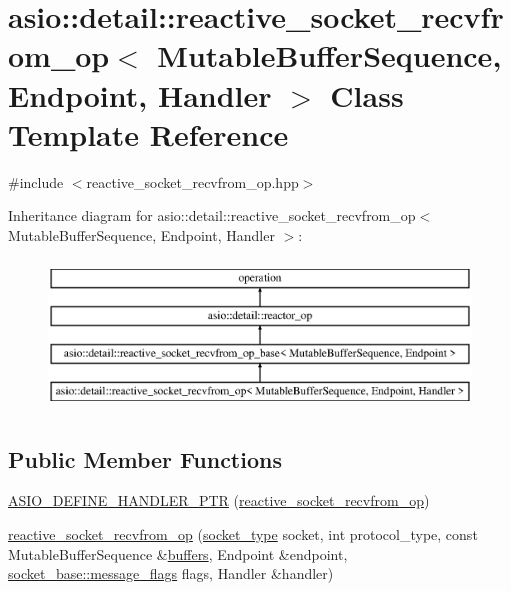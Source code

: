 \hypertarget{classasio_1_1detail_1_1reactive__socket__recvfrom__op}{}\section{asio\+:\+:detail\+:\+:reactive\+\_\+socket\+\_\+recvfrom\+\_\+op$<$ Mutable\+Buffer\+Sequence, Endpoint, Handler $>$ Class Template Reference}
\label{classasio_1_1detail_1_1reactive__socket__recvfrom__op}


{\ttfamily \#include $<$reactive\+\_\+socket\+\_\+recvfrom\+\_\+op.\+hpp$>$}

Inheritance diagram for asio\+:\+:detail\+:\+:reactive\+\_\+socket\+\_\+recvfrom\+\_\+op$<$ Mutable\+Buffer\+Sequence, Endpoint, Handler $>$\+:\begin{figure}[H]
\begin{center}
\leavevmode
\includegraphics[height=4.000000cm]{classasio_1_1detail_1_1reactive__socket__recvfrom__op}
\end{center}
\end{figure}
\subsection*{Public Member Functions}
\begin{DoxyCompactItemize}
\item 
\hyperlink{classasio_1_1detail_1_1reactive__socket__recvfrom__op_aa4fe6eb87d8184419860c57650ecad16}{A\+S\+I\+O\+\_\+\+D\+E\+F\+I\+N\+E\+\_\+\+H\+A\+N\+D\+L\+E\+R\+\_\+\+P\+T\+R} (\hyperlink{classasio_1_1detail_1_1reactive__socket__recvfrom__op}{reactive\+\_\+socket\+\_\+recvfrom\+\_\+op})
\item 
\hyperlink{classasio_1_1detail_1_1reactive__socket__recvfrom__op_acd0c9e80cc507f518ed9bde6b8552aac}{reactive\+\_\+socket\+\_\+recvfrom\+\_\+op} (\hyperlink{namespaceasio_1_1detail_a6798c771dd84b79798b1a08150706ea9}{socket\+\_\+type} socket, int protocol\+\_\+type, const Mutable\+Buffer\+Sequence \&\hyperlink{group__async__read_ga54dede45c3175148a77fe6635222c47d}{buffers}, Endpoint \&endpoint, \hyperlink{classasio_1_1socket__base_ac3cf77465dfedfe1979b5415cf32cc94}{socket\+\_\+base\+::message\+\_\+flags} flags, Handler \&handler)
\end{DoxyCompactItemize}
